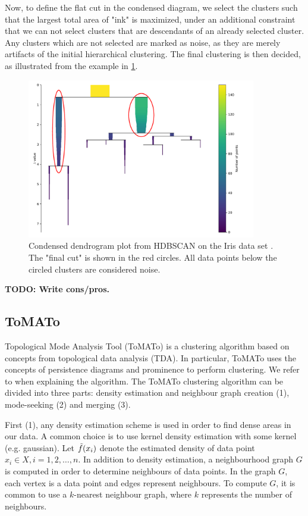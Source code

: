 Now, to define the flat cut in the condensed diagram, we select the clusters such that the largest total area of "ink" is maximized, under an additional constraint that we can not select clusters that are descendants of an already selected cluster. Any clusters which are not selected are marked as noise, as they are merely artifacts of the initial hierarchical clustering. The final clustering is then decided, as illustrated from the example in \cref{fig:hdbscan-condensed-dendrogram-final-cut-example}.
\begin{figure}[H]
    \centering
    \includegraphics[width=10cm]{thesis/figures/hdbscan-condensed-tree-final-cut-example.pdf}
    \caption{Condensed dendrogram plot from HDBSCAN on the Iris data set \cite{Fisher1936}. The "final cut" is shown in the red circles. All data points below the circled clusters are considered noise.}
    \label{fig:hdbscan-condensed-dendrogram-final-cut-example}
\end{figure}

\textbf{TODO: Write cons/pros.}

\subsection{ToMATo}
Topological Mode Analysis Tool (ToMATo) \cite[2. ToMATo]{Oudot2015} is a clustering algorithm based on concepts from topological data analysis (TDA). In particular, ToMATo uses the concepts of persistence diagrams and prominence to perform clustering. We refer to \cite[2. ToMATo]{Oudot2015} when explaining the algorithm. The ToMATo clustering algorithm can be divided into three parts: density estimation and neighbour graph creation (1), mode-seeking (2) and merging (3).

First (1), any density estimation scheme is used in order to find dense areas in our data. A common choice is to use kernel density estimation with some kernel (e.g. gaussian). Let $\Tilde{f}(x_i)$ denote the estimated density of data point $x_i \in X, i = 1, 2, \ldots, n$. In addition to density estimation, a neighbourhood graph $G$ is computed in order to determine neighbours of data points. In the graph $G$, each vertex is a data point and edges represent neighbours. To compute $G$, it is common to use a $k$-nearest neighbour graph, where $k$ represents the number of neighbours.

